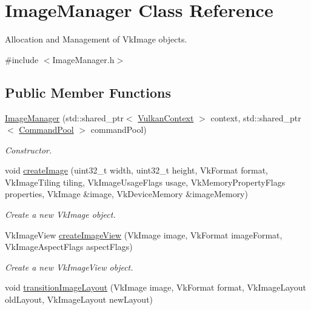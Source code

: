 \hypertarget{class_image_manager}{}\section{Image\+Manager Class Reference}
\label{class_image_manager}


Allocation and Management of Vk\+Image objects.  




{\ttfamily \#include $<$Image\+Manager.\+h$>$}

\subsection*{Public Member Functions}
\begin{DoxyCompactItemize}
\item 
\mbox{\hyperlink{class_image_manager_adc24d10b860e7d33641636267e0e5e85}{Image\+Manager}} (std\+::shared\+\_\+ptr$<$ \mbox{\hyperlink{class_vulkan_context}{Vulkan\+Context}} $>$ context, std\+::shared\+\_\+ptr$<$ \mbox{\hyperlink{class_command_pool}{Command\+Pool}} $>$ command\+Pool)
\begin{DoxyCompactList}\small\item\em Constructor. \end{DoxyCompactList}\item 
void \mbox{\hyperlink{class_image_manager_aba1591b66357882bb624595bb61fa059}{create\+Image}} (uint32\+\_\+t width, uint32\+\_\+t height, Vk\+Format format, Vk\+Image\+Tiling tiling, Vk\+Image\+Usage\+Flags usage, Vk\+Memory\+Property\+Flags properties, Vk\+Image \&image, Vk\+Device\+Memory \&image\+Memory)
\begin{DoxyCompactList}\small\item\em Create a new Vk\+Image object. \end{DoxyCompactList}\item 
Vk\+Image\+View \mbox{\hyperlink{class_image_manager_a9a8948059660e956685b90bb8d5ba9f1}{create\+Image\+View}} (Vk\+Image image, Vk\+Format image\+Format, Vk\+Image\+Aspect\+Flags aspect\+Flags)
\begin{DoxyCompactList}\small\item\em Create a new Vk\+Image\+View object. \end{DoxyCompactList}\item 
void \mbox{\hyperlink{class_image_manager_acb42d9681e1abf4b7abf62083b0c06dc}{transition\+Image\+Layout}} (Vk\+Image image, Vk\+Format format, Vk\+Image\+Layout old\+Layout, Vk\+Image\+Layout new\+Layout)

\end{DoxyCompactItemize}
